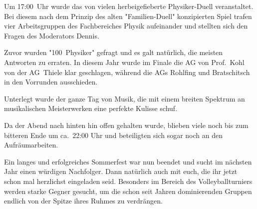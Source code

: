\begin{multicols*}{2}
Um 17:00~Uhr wurde das von vielen herbeigefieberte Physiker-Duell veranstaltet. Bei diesem nach dem Prinzip des alten "Familien-Duell" konzipierten Spiel trafen vier Arbeitsgruppen des Fachbereiches Physik aufeinander und stellten sich den Fragen des Moderators Dennis.

Zuvor wurden "100~Physiker" gefragt und es galt natürlich, die meisten Antworten zu erraten. In diesem Jahr wurde im Finale die AG von Prof.\ Kohl von der AG~Thiele klar geschlagen, während die AGs Rohlfing und Bratschitsch in den Vorrunden ausschieden. 

Unterlegt wurde der ganze Tag von Musik, die mit einem breiten Spektrum an musikalischen Meisterwerken eine perfekte Kulisse schuf.

Da der Abend nach hinten hin offen gehalten wurde, blieben viele noch bis zum bitteren Ende um ca.~22:00 Uhr und beteiligten sich sogar noch an den Aufräumarbeiten.

Ein langes und erfolgreiches Sommerfest war nun beendet und sucht im nächsten Jahr einen würdigen Nachfolger. Dann natürlich auch mit euch, die ihr jetzt schon mal herzlichst eingeladen seid. Besonders im Bereich des Volleyballturniers werden starke Gegner gesucht, um die schon seit Jahren dominierenden Gruppen endlich von der Spitze ihres Ruhmes zu verdrängen.

\end{multicols*}
